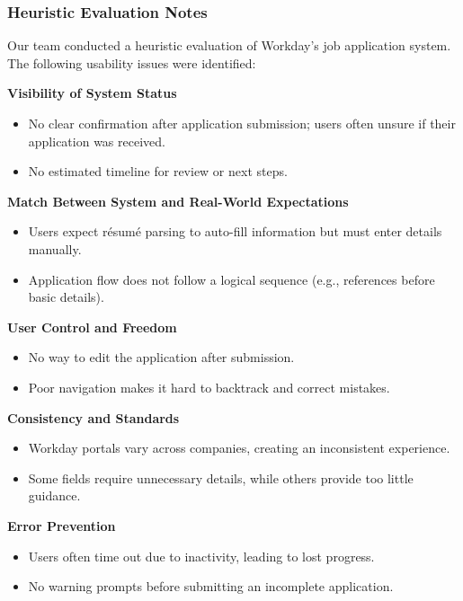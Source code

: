 \documentclass[
	letterpaper, %
]{jdf}
\begin{document}
\subsubsection*{Heuristic Evaluation Notes}  

Our team conducted a heuristic evaluation of Workday’s job application system. The following usability issues were identified:   

\textbf{Visibility of System Status}  
\begin{itemize}  
    \item No clear confirmation after application submission; users often unsure if their application was received.  
    \item No estimated timeline for review or next steps.  
\end{itemize}   

\textbf{Match Between System and Real-World Expectations}  
\begin{itemize}  
    \item Users expect résumé parsing to auto-fill information but must enter details manually.  
    \item Application flow does not follow a logical sequence (e.g., references before basic details).  
\end{itemize}  


\textbf{User Control and Freedom}  
\begin{itemize}  
    \item No way to edit the application after submission.  
    \item Poor navigation makes it hard to backtrack and correct mistakes.  
\end{itemize}   

\textbf{Consistency and Standards}  
\begin{itemize}  
    \item Workday portals vary across companies, creating an inconsistent experience.  
    \item Some fields require unnecessary details, while others provide too little guidance.  
\end{itemize}  

\textbf{Error Prevention}  
\begin{itemize}  
    \item Users often time out due to inactivity, leading to lost progress.  
    \item No warning prompts before submitting an incomplete application.  
\end{itemize}   
\end{document}
